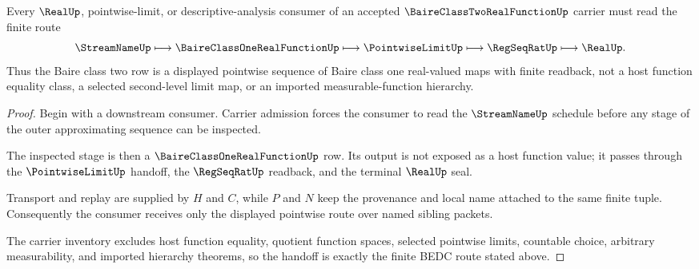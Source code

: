 \begin{theorem}
\label{thm:baire-class-two-real-function-pointwise-handoff}
Every $\RealUp$, pointwise-limit, or descriptive-analysis consumer of an accepted $\BaireClassTwoRealFunctionUp$ carrier must read the finite route
$$
\StreamNameUp
\longmapsto
\BaireClassOneRealFunctionUp
\longmapsto
\PointwiseLimitUp
\longmapsto
\RegSeqRatUp
\longmapsto
\RealUp .
$$
Thus the Baire class two row is a displayed pointwise sequence of Baire class one real-valued maps with finite readback, not a host function equality class, a selected second-level limit map, or an imported measurable-function hierarchy.
\end{theorem}
\begin{proof}
Begin with a downstream consumer. Carrier admission forces the consumer to read the $\StreamNameUp$ schedule before any stage of the outer approximating sequence can be inspected.

The inspected stage is then a $\BaireClassOneRealFunctionUp$ row. Its output is not exposed as a host function value; it passes through the $\PointwiseLimitUp$ handoff, the $\RegSeqRatUp$ readback, and the terminal $\RealUp$ seal.

Transport and replay are supplied by $H$ and $C$, while $P$ and $N$ keep the provenance and local name attached to the same finite tuple. Consequently the consumer receives only the displayed pointwise route over named sibling packets.

The carrier inventory excludes host function equality, quotient function spaces, selected pointwise limits, countable choice, arbitrary measurability, and imported hierarchy theorems, so the handoff is exactly the finite BEDC route stated above.
\end{proof}



